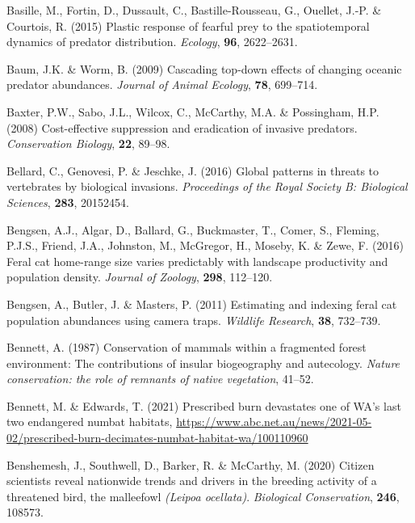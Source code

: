 \documentclass[11pt,a4paper,titlepage,twoside,openright]{style/unimelbthesis}
\begin{document}
\begin{mainmatter}
\leavevmode\hypertarget{ref-basille2015plastic}{}%
Basille, M., Fortin, D., Dussault, C., Bastille-Rousseau, G., Ouellet, J.-P. \& Courtois, R. (2015) Plastic response of fearful prey to the spatiotemporal dynamics of predator distribution. \emph{Ecology}, \textbf{96}, 2622--2631.

\leavevmode\hypertarget{ref-baum2009cascading}{}%
Baum, J.K. \& Worm, B. (2009) Cascading top-down effects of changing oceanic predator abundances. \emph{Journal of Animal Ecology}, \textbf{78}, 699--714.

\leavevmode\hypertarget{ref-baxter2008cost}{}%
Baxter, P.W., Sabo, J.L., Wilcox, C., McCarthy, M.A. \& Possingham, H.P. (2008) Cost-effective suppression and eradication of invasive predators. \emph{Conservation Biology}, \textbf{22}, 89--98.

\leavevmode\hypertarget{ref-bellard2016global}{}%
Bellard, C., Genovesi, P. \& Jeschke, J. (2016) Global patterns in threats to vertebrates by biological invasions. \emph{Proceedings of the Royal Society B: Biological Sciences}, \textbf{283}, 20152454.

\leavevmode\hypertarget{ref-bengsen2016feral}{}%
Bengsen, A.J., Algar, D., Ballard, G., Buckmaster, T., Comer, S., Fleming, P.J.S., Friend, J.A., Johnston, M., McGregor, H., Moseby, K. \& Zewe, F. (2016) Feral cat home-range size varies predictably with landscape productivity and population density. \emph{Journal of Zoology}, \textbf{298}, 112--120.

\leavevmode\hypertarget{ref-bengsen2011estimating}{}%
Bengsen, A., Butler, J. \& Masters, P. (2011) Estimating and indexing feral cat population abundances using camera traps. \emph{Wildlife Research}, \textbf{38}, 732--739.

\leavevmode\hypertarget{ref-bennett1987conservation}{}%
Bennett, A. (1987) Conservation of mammals within a fragmented forest environment: The contributions of insular biogeography and autecology. \emph{Nature conservation: the role of remnants of native vegetation}, 41--52.

\leavevmode\hypertarget{ref-bennett2021prescribed}{}%
Bennett, M. \& Edwards, T. (2021) Prescribed burn devastates one of WA's last two endangered numbat habitats, \url{https://www.abc.net.au/news/2021-05-02/prescribed-burn-decimates-numbat-habitat-wa/100110960}

\leavevmode\hypertarget{ref-benshemesh2020citizen}{}%
Benshemesh, J., Southwell, D., Barker, R. \& McCarthy, M. (2020) Citizen scientists reveal nationwide trends and drivers in the breeding activity of a threatened bird, the malleefowl \emph{(Leipoa ocellata)}. \emph{Biological Conservation}, \textbf{246}, 108573.


\end{mainmatter}
\end{document}
